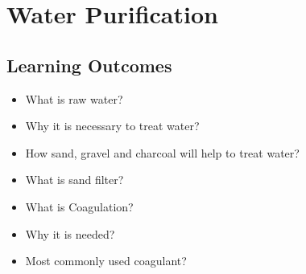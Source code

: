 \chapter{Water Purification}

\section*{Learning Outcomes}
\small{
\begin{itemize}[leftmargin=*]\itemsep0em
\item What is raw water?
\item Why it is necessary to treat water?
\item How sand, gravel and charcoal will help to treat water?
\item What is sand filter?
\item What is Coagulation?
\item Why it is needed?
\item Most commonly used coagulant?

\end{itemize}
}
